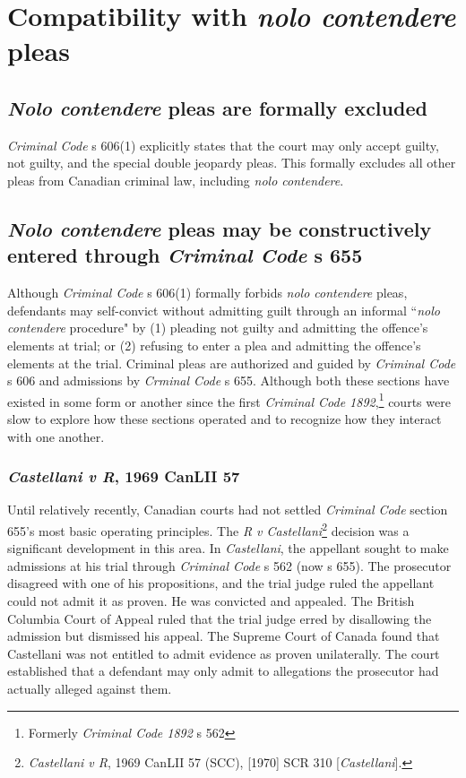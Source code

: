 \section{Compatibility with \textit{nolo contendere} pleas}

\subsection{\textit{Nolo contendere} pleas are formally excluded}

\textit{Criminal Code} s 606(1) explicitly states that the court may only accept guilty, not guilty, and the special double jeopardy pleas. This formally excludes all other pleas from Canadian criminal law, including \textit{nolo contendere}. 

\subsection{\textit{Nolo contendere} pleas may be constructively entered through \textit{Criminal Code} s 655}

Although \textit{Criminal Code} s 606(1) formally forbids \textit{nolo contendere} pleas, defendants may self-convict without admitting guilt through an informal ``\textit{nolo contendere} procedure" by (1) pleading not guilty and admitting the offence's elements at trial; or (2) refusing to enter a plea and admitting the offence's elements at the trial. Criminal pleas are authorized and guided by \textit{Criminal Code} s 606 and admissions by \textit{Crminal Code} s 655. Although both these sections have existed in some form or another since the first \textit{Criminal Code 1892},\footnote{Formerly \textit{Criminal Code 1892} s 562} courts were slow to explore how these sections operated and to recognize how they interact with one another.

\subsubsection{\textit{Castellani v R}, 1969 CanLII 57}

Until relatively recently, Canadian courts had not settled \textit{Criminal Code} section 655's most basic operating principles. The \textit{R v Castellani}\footnote{\textit{Castellani v R}, 1969 CanLII 57 (SCC), [1970] SCR 310 [\textit{Castellani}].} decision was a significant development in this area. In \textit{Castellani}, the appellant sought to make admissions at his trial through \textit{Criminal Code} s 562 (now s 655). The prosecutor disagreed with one of his propositions, and the trial judge ruled the appellant could not admit it as proven. He was convicted and appealed. The British Columbia Court of Appeal ruled that the trial judge erred by disallowing the admission but dismissed his appeal. The Supreme Court of Canada found that Castellani was not entitled to admit evidence as proven unilaterally. The court established that a defendant may only admit to allegations the prosecutor had actually alleged against them.

